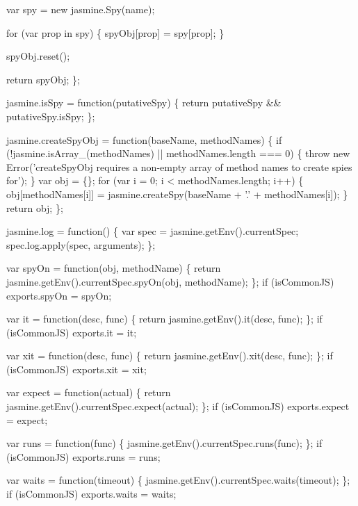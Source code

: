 \begin{DoxyCodeInclude}
  var spy = \textcolor{keyword}{new} jasmine.Spy(name);

  \textcolor{keywordflow}{for} (var prop in spy) \{
    spyObj[prop] = spy[prop];
  \}

  spyObj.reset();

  \textcolor{keywordflow}{return} spyObj;
\};

jasmine.isSpy = \textcolor{keyword}{function}(putativeSpy) \{
  \textcolor{keywordflow}{return} putativeSpy && putativeSpy.isSpy;
\};

jasmine.createSpyObj = \textcolor{keyword}{function}(baseName, methodNames) \{
  \textcolor{keywordflow}{if} (!jasmine.isArray\_(methodNames) || methodNames.length === 0) \{
    \textcolor{keywordflow}{throw} \textcolor{keyword}{new} Error(\textcolor{stringliteral}{'createSpyObj requires a non-empty array of method names to create spies for'});
  \}
  var obj = \{\};
  \textcolor{keywordflow}{for} (var i = 0; i < methodNames.length; i++) \{
    obj[methodNames[i]] = jasmine.createSpy(baseName + \textcolor{charliteral}{'.'} + methodNames[i]);
  \}
  \textcolor{keywordflow}{return} obj;
\};

jasmine.log = \textcolor{keyword}{function}() \{
  var spec = jasmine.getEnv().currentSpec;
  spec.log.apply(spec, arguments);
\};

var spyOn = \textcolor{keyword}{function}(obj, methodName) \{
  \textcolor{keywordflow}{return} jasmine.getEnv().currentSpec.spyOn(obj, methodName);
\};
\textcolor{keywordflow}{if} (isCommonJS) exports.spyOn = spyOn;

var it = \textcolor{keyword}{function}(desc, func) \{
  \textcolor{keywordflow}{return} jasmine.getEnv().it(desc, func);
\};
\textcolor{keywordflow}{if} (isCommonJS) exports.it = it;

var xit = \textcolor{keyword}{function}(desc, func) \{
  \textcolor{keywordflow}{return} jasmine.getEnv().xit(desc, func);
\};
\textcolor{keywordflow}{if} (isCommonJS) exports.xit = xit;

var expect = \textcolor{keyword}{function}(actual) \{
  \textcolor{keywordflow}{return} jasmine.getEnv().currentSpec.expect(actual);
\};
\textcolor{keywordflow}{if} (isCommonJS) exports.expect = expect;

var runs = \textcolor{keyword}{function}(func) \{
  jasmine.getEnv().currentSpec.runs(func);
\};
\textcolor{keywordflow}{if} (isCommonJS) exports.runs = runs;

var waits = \textcolor{keyword}{function}(timeout) \{
  jasmine.getEnv().currentSpec.waits(timeout);
\};
\textcolor{keywordflow}{if} (isCommonJS) exports.waits = waits;


\end{DoxyCodeInclude}

